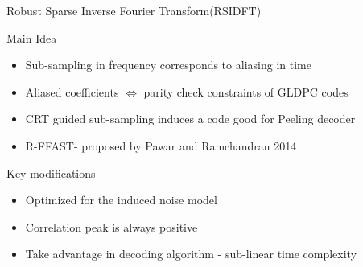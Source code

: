 \begin{frame}{Robust Sparse Inverse Fourier Transform(RSIDFT)}
\begin{block}{Main Idea}
	\begin{itemize}
		\item \alert{Sub-sampling} in frequency corresponds to \alert{aliasing} in time
		\item Aliased coefficients $\Leftrightarrow$ parity check constraints of \alert{GLDPC codes}
		\item \alert{CRT} guided sub-sampling induces a code good for \alert{Peeling decoder}
		\item R-FFAST- proposed by Pawar and Ramchandran 2014
	\end{itemize}
\end{block}
\begin{block}{Key modifications}
   \begin{itemize}
   	\item Optimized for the induced noise model
   	\item Correlation peak is always {\color{blue} positive}
   	\item Take advantage in decoding algorithm - {\color{blue}sub-linear} time complexity
   \end{itemize}
\end{block}
\end{frame}




